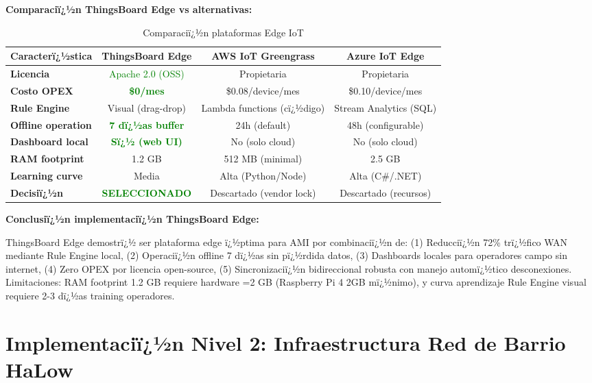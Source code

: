\textbf{Comparaciï¿½n ThingsBoard Edge vs alternativas:}

\begin{table}[H]
\centering
\caption{Comparaciï¿½n plataformas Edge IoT}
\label{tab:impl-edge-comparison}
\small
\begin{tabular}{|l|c|c|c|}
\hline
\rowcolor{gray!20}
\textbf{Caracterï¿½stica} & \textbf{ThingsBoard Edge} & \textbf{AWS IoT Greengrass} & \textbf{Azure IoT Edge} \\
\hline
\textbf{Licencia} & \textcolor{green}{Apache 2.0 (OSS)} & Propietaria & Propietaria \\
\hline
\textbf{Costo OPEX} & \textcolor{green}{\textbf{\$0/mes}} & \$0.08/device/mes & \$0.10/device/mes \\
\hline
\textbf{Rule Engine} & Visual (drag-drop) & Lambda functions (cï¿½digo) & Stream Analytics (SQL) \\
\hline
\textbf{Offline operation} & \textcolor{green}{\textbf{7 dï¿½as buffer}} & 24h (default) & 48h (configurable) \\
\hline
\textbf{Dashboard local} & \textcolor{green}{\textbf{Sï¿½ (web UI)}} & No (solo cloud) & No (solo cloud) \\
\hline
\textbf{RAM footprint} & 1.2 GB & 512 MB (minimal) & 2.5 GB \\
\hline
\textbf{Learning curve} & Media & Alta (Python/Node) & Alta (C\#/.NET) \\
\hline
\textbf{Decisiï¿½n} & \textcolor{green}{\textbf{SELECCIONADO}} & Descartado (vendor lock) & Descartado (recursos) \\
\hline
\end{tabular}
\end{table}

\textbf{Conclusiï¿½n implementaciï¿½n ThingsBoard Edge:}

ThingsBoard Edge demostrï¿½ ser plataforma edge ï¿½ptima para AMI por combinaciï¿½n de: (1) Reducciï¿½n 72\% trï¿½fico WAN mediante Rule Engine local, (2) Operaciï¿½n offline 7 dï¿½as sin pï¿½rdida datos, (3) Dashboards locales para operadores campo sin internet, (4) Zero OPEX por licencia open-source, (5) Sincronizaciï¿½n bidireccional robusta con manejo automï¿½tico desconexiones. Limitaciones: RAM footprint 1.2 GB requiere hardware =2 GB (Raspberry Pi 4 2GB mï¿½nimo), y curva aprendizaje Rule Engine visual requiere 2-3 dï¿½as training operadores.

\section{Implementaciï¿½n Nivel 2: Infraestructura Red de Barrio HaLow}
\label{sec:impl-nivel2-halow}

